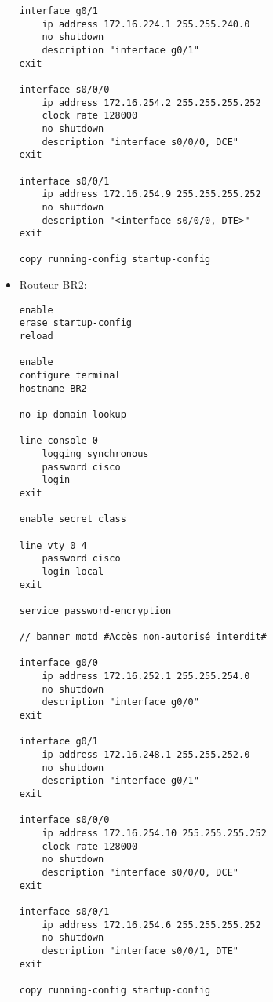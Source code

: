 \documentclass[a4paper]{article}
\begin{document}
\begin{itemize}
\begin{verbatim}
interface g0/1
    ip address 172.16.224.1 255.255.240.0
    no shutdown
    description "interface g0/1"
exit

interface s0/0/0
    ip address 172.16.254.2 255.255.255.252
    clock rate 128000
    no shutdown
    description "interface s0/0/0, DCE"
exit

interface s0/0/1
    ip address 172.16.254.9 255.255.255.252
    no shutdown
    description "<interface s0/0/0, DTE>"
exit

copy running-config startup-config
\end{verbatim}





\item Routeur BR2:
\begin{verbatim}
enable
erase startup-config
reload

enable
configure terminal
hostname BR2

no ip domain-lookup

line console 0
    logging synchronous
    password cisco
    login
exit

enable secret class

line vty 0 4
    password cisco
    login local
exit

service password-encryption

// banner motd #Accès non-autorisé interdit#

interface g0/0
    ip address 172.16.252.1 255.255.254.0
    no shutdown
    description "interface g0/0"
exit

interface g0/1
    ip address 172.16.248.1 255.255.252.0
    no shutdown
    description "interface g0/1"
exit

interface s0/0/0
    ip address 172.16.254.10 255.255.255.252
    clock rate 128000
    no shutdown
    description "interface s0/0/0, DCE"
exit

interface s0/0/1
    ip address 172.16.254.6 255.255.255.252
    no shutdown
    description "interface s0/0/1, DTE"
exit

copy running-config startup-config
\end{verbatim}





\end{itemize}
\end{document}
